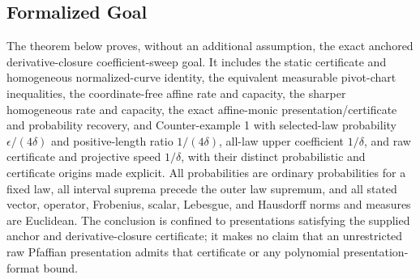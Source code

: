 \subsection{Formalized Goal}\label{sec:formalized-goal}
The theorem below proves, without an additional assumption, the exact anchored derivative-closure
coefficient-sweep goal. It includes the static certificate and homogeneous normalized-curve identity, the
equivalent measurable pivot-chart inequalities, the coordinate-free affine rate and capacity, the sharper
homogeneous rate and capacity, the exact affine-monic presentation/certificate and probability recovery, and
Counter-example 1 with selected-law probability $\epsilon/(4\delta)$ and positive-length ratio
$1/(4\delta)$, all-law upper coefficient $1/\delta$, and raw certificate and projective speed $1/\delta$,
with their distinct probabilistic and certificate origins made explicit. All probabilities are ordinary
probabilities for a fixed law, all interval
suprema precede the outer law supremum,
and all stated vector, operator, Frobenius, scalar, Lebesgue, and Hausdorff norms and measures are Euclidean.
The conclusion is confined to presentations satisfying the supplied anchor and derivative-closure certificate;
it makes no claim that an unrestricted raw Pfaffian presentation admits that certificate or any polynomial
presentation-format bound.
